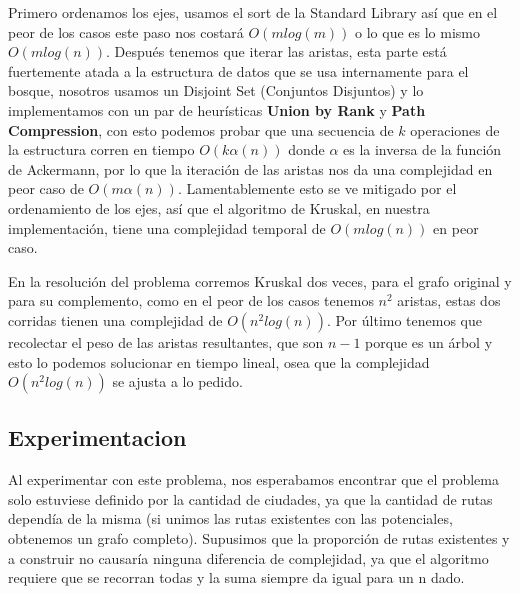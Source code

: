 Primero ordenamos los ejes, usamos el sort de la Standard Library así que en el peor de los casos este paso nos costará $O(mlog(m))$ o lo que es lo mismo $O(mlog(n))$. Después tenemos que iterar las aristas, esta parte está fuertemente atada a la estructura de datos que se usa internamente para el bosque, nosotros usamos un Disjoint Set (Conjuntos Disjuntos) y lo implementamos con un par de heurísticas \textbf{Union by Rank} y \textbf{Path Compression}, con esto podemos probar que una secuencia de $k$ operaciones de la estructura corren en tiempo $O(k\alpha (n))$ donde $\alpha$ es la inversa de la función de Ackermann, por lo que la iteración de las aristas nos da una complejidad en peor caso de $O(m\alpha (n))$. Lamentablemente esto se ve mitigado por el ordenamiento de los ejes, así que el algoritmo de Kruskal, en nuestra implementación, tiene una complejidad temporal de $O(mlog(n))$ en peor caso. 
 
En la resolución del problema corremos Kruskal dos veces, para el grafo original y para su complemento, como en el peor de los casos tenemos $n^2$ aristas, estas dos corridas tienen una complejidad de $O(n^2log(n))$. Por último tenemos que recolectar el peso de las aristas resultantes, que son $n-1$ porque es un árbol y esto lo podemos solucionar en tiempo lineal, osea que la complejidad $O(n^2log(n))$ se ajusta a lo pedido.


\subsection{Experimentacion}

Al experimentar con este problema, nos esperabamos encontrar que el problema solo estuviese definido por la cantidad de ciudades, ya que la cantidad de rutas dependía de la misma (si unimos las rutas existentes con las potenciales, obtenemos un grafo completo). Supusimos que la proporción de rutas existentes y a construir no causaría ninguna diferencia de complejidad, ya que el algoritmo requiere que se recorran todas y la suma siempre da igual para un n dado.

